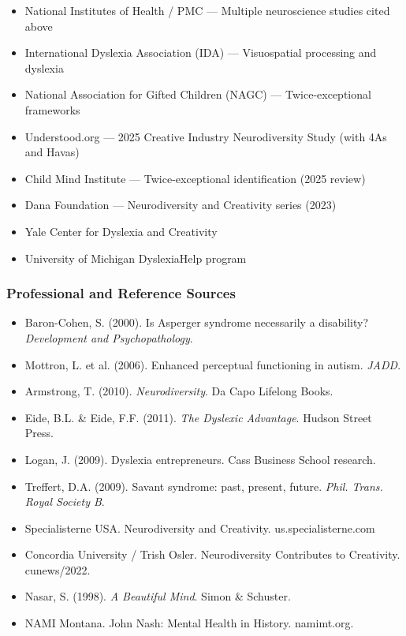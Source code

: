 \documentclass[11pt,letterpaper]{article}
\begin{document}
\begin{itemize}[leftmargin=*, itemsep=0.2em]
  \item National Institutes of Health / PMC --- Multiple neuroscience studies cited above
  \item International Dyslexia Association (IDA) --- Visuospatial processing and dyslexia
  \item National Association for Gifted Children (NAGC) --- Twice-exceptional frameworks
  \item Understood.org --- 2025 Creative Industry Neurodiversity Study (with 4As and Havas)
  \item Child Mind Institute --- Twice-exceptional identification (2025 review)
  \item Dana Foundation --- Neurodiversity and Creativity series (2023)
  \item Yale Center for Dyslexia and Creativity
  \item University of Michigan DyslexiaHelp program
\end{itemize}

\subsubsection{Professional and Reference Sources}

\begin{itemize}[leftmargin=*, itemsep=0.2em]
  \item Baron-Cohen, S. (2000). Is Asperger syndrome necessarily a disability? \textit{Development and Psychopathology}.
  \item Mottron, L. et al. (2006). Enhanced perceptual functioning in autism. \textit{JADD}.
  \item Armstrong, T. (2010). \textit{Neurodiversity}. Da Capo Lifelong Books.
  \item Eide, B.L. \& Eide, F.F. (2011). \textit{The Dyslexic Advantage}. Hudson Street Press.
  \item Logan, J. (2009). Dyslexia entrepreneurs. Cass Business School research.
  \item Treffert, D.A. (2009). Savant syndrome: past, present, future. \textit{Phil. Trans. Royal Society B}.
  \item Specialisterne USA. Neurodiversity and Creativity. us.specialisterne.com
  \item Concordia University / Trish Osler. Neurodiversity Contributes to Creativity. cunews/2022.
  \item Nasar, S. (1998). \textit{A Beautiful Mind}. Simon \& Schuster.
  \item NAMI Montana. John Nash: Mental Health in History. namimt.org.
\end{itemize}
\end{document}
